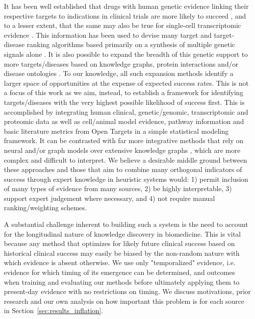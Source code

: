 \documentclass{article}
\begin{document}
It has been well established that drugs with human genetic evidence linking their respective targets to indications in clinical trials are more likely to succeed \cite{Nelson2015-eg,King2019-rc,Minikel2023.06.23.23291765,Razuvayevskaya2023.02.07.23285407,PMID:30652614,PMID:24833294,PMID:35804044,PMID:37803084,PMID:36963162}, and to a lesser extent, that the same may also be true for single-cell transcriptomic evidence \cite{Dann2024.04.04.24305313}. This information has been used to devise many target and target-disease ranking algorithms based primarily on a synthesis of multiple genetic signals alone \cite{PMID:38172303,Koscielny2017-rr,PMID:31253980}. It is also possible to expand the breadth of this genetic support to more targets/diseases based on knowledge graphs, protein interactions and/or disease ontologies \cite{PMID:33262371,Bao2022-bq,Sadler2023-xd,PMID:36087372,PMID:36823319}. To our knowledge, all such expansion methods identify a larger space of opportunities at the expense of expected success rates. This is not a focus of this work as we aim, instead, to establish a framework for identifying targets/diseases with the very highest possible likelihood of success first. This is accomplished by integrating human clinical, genetic/genomic, transcriptomic and proteomic data as well as cell/animal model evidence, pathway information and basic literature metrics from Open Targets \cite{Koscielny2017-rr} in a simple statistical modeling framework. It can be contrasted with far more integrative methods that rely on neural and/or graph models over extensive knowledge graphs \cite{Paliwal2020-hr,PMID:33741907,pittala2020relationweighted,PMID:32750869}, which are more complex and difficult to interpret. We believe a desirable middle ground between these approaches and those that aim to combine many orthogonal indicators of success through expert knowledge in heuristic systems \cite{PMID:38404138,Koscielny2017-rr} would: 1) permit inclusion of many types of evidence from many sources, 2) be highly interpretable, 3) support expert judgement where necessary, and 4) not require manual ranking/weighting schemes.

A substantial challenge inherent to building such a system is the need to account for the longitudinal nature of knowledge discovery in biomedicine. This is vital because any method that optimizes for likely future clinical success based on historical clinical success may easily be biased by the non-random nature with which evidence is absent otherwise. We use only "temporalized" evidence, i.e. evidence for which timing of its emergence can be determined, and outcomes when training and evaluating our methods before ultimately applying them to present-day evidence with no restrictions on timing. We discuss motivations, prior research and our own analysis on how important this problem is for each source in Section~\ref{sec:results_inflation}.
\end{document}
